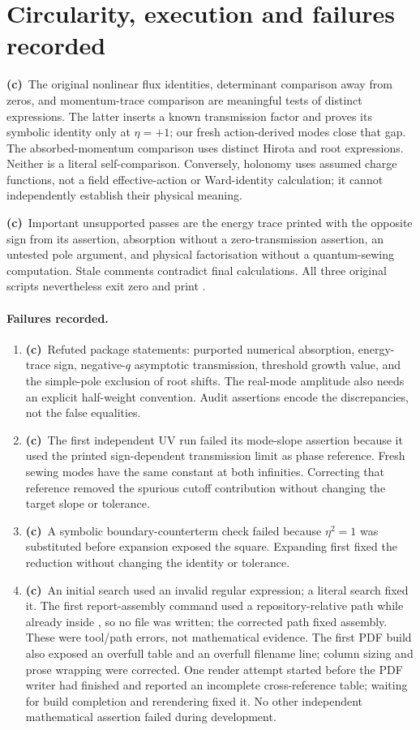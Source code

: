 \documentclass[11pt,a4paper]{article}
\newcommand{\Lc}{\textbf{(c)}\ }
\newcommand{\file}[1]{\texttt{\detokenize{#1}}}
\begin{document}
\section{Circularity, execution and failures recorded}
\Lc The original nonlinear flux identities, determinant comparison away
from zeros, and momentum-trace comparison are meaningful tests of distinct
expressions. The latter inserts a known transmission factor and proves its
symbolic identity only at $\eta=+1$; our fresh action-derived modes close
that gap. The absorbed-momentum comparison uses distinct Hirota and root
expressions. Neither is a literal self-comparison. Conversely, holonomy
uses assumed charge functions, not a field effective-action or Ward-identity
calculation; it cannot independently establish their physical meaning.

\Lc Important unsupported passes are the energy trace printed with the
opposite sign from its assertion, absorption without a zero-transmission
assertion, an untested pole argument, and physical factorisation without a
quantum-sewing computation. Stale comments contradict final calculations.
All three original scripts nevertheless exit zero and print
\file{ALL CHECKS PASSED}.

\paragraph{Failures recorded.}
\begin{enumerate}
\item \Lc Refuted package statements: purported numerical absorption,
energy-trace sign, negative-$q$ asymptotic transmission, threshold growth
value, and the simple-pole exclusion of root shifts. The real-mode amplitude
also needs an explicit half-weight convention. Audit assertions encode the
discrepancies, not the false equalities.
\item \Lc The first independent UV run failed its mode-slope assertion
because it used the printed sign-dependent transmission limit as phase
reference. Fresh sewing modes have the same constant at both infinities.
Correcting that reference removed the spurious cutoff contribution without
changing the target slope or tolerance.
\item \Lc A symbolic boundary-counterterm check failed because $\eta^2=1$
was substituted before expansion exposed the square. Expanding first fixed
the reduction without changing the identity or tolerance.
\item \Lc An initial search used an invalid regular expression; a literal
search fixed it. The first report-assembly command used a repository-relative
path while already inside \file{phase2/}, so no file was written; the corrected
path fixed assembly. These were tool/path errors, not mathematical evidence.
The first PDF build also exposed an overfull table and an overfull filename
line; column sizing and prose wrapping were corrected. One render attempt
started before the PDF writer had finished and reported an incomplete cross-reference
table; waiting for build completion and rerendering fixed it. No other independent
mathematical assertion failed during development.
\end{enumerate}
\end{document}
